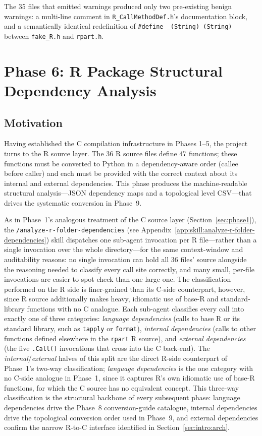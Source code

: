 \documentclass[12pt]{article}
\newcommand{\skillapp}[2]{\texttt{/#1} (see Appendix~\ref{app:skill:#2})}
\begin{document}
The 35 files that emitted warnings produced only two pre-existing benign warnings: a multi-line comment in \texttt{R\_CallMethodDef.h}'s documentation block, and a semantically identical redefinition of \texttt{\#define \_(String) (String)} between \texttt{fake\_R.h} and \texttt{rpart.h}.

\section{Phase 6: R Package Structural Dependency Analysis}
\label{sec:phase6}

\subsection{Motivation}

Having established the C compilation infrastructure in Phases 1--5, the project turns to the R source layer. The 36 R source files define 47 functions; these functions must be converted to Python in a dependency-aware order (callee before caller) and each must be provided with the correct context about its internal and external dependencies. This phase produces the machine-readable structural analysis---JSON dependency maps and a topological level CSV---that drives the systematic conversion in Phase~9.

As in Phase~1's analogous treatment of the C source layer (Section~\ref{sec:phase1}), the \skillapp{analyze-r-folder-dependencies}{analyze-r-folder-dependencies} skill dispatches one sub-agent invocation per R file---rather than a single invocation over the whole directory---for the same context-window and auditability reasons: no single invocation can hold all 36 files' source alongside the reasoning needed to classify every call site correctly, and many small, per-file invocations are easier to spot-check than one large one. The classification performed on the R side is finer-grained than its C-side counterpart, however, since R source additionally makes heavy, idiomatic use of base-R and standard-library functions with no C analogue. Each sub-agent classifies every call into exactly one of three categories: \emph{language dependencies} (calls to base R or its standard library, such as \texttt{tapply} or \texttt{format}), \emph{internal dependencies} (calls to other functions defined elsewhere in the \texttt{rpart} R source), and \emph{external dependencies} (the five \texttt{.Call()} invocations that cross into the C back-end). The \emph{internal}/\emph{external} halves of this split are the direct R-side counterpart of Phase~1's two-way classification; \emph{language dependencies} is the one category with no C-side analogue in Phase~1, since it captures R's own idiomatic use of base-R functions, for which the C source has no equivalent concept. This three-way classification is the structural backbone of every subsequent phase: language dependencies drive the Phase~8 conversion-guide catalogue, internal dependencies drive the topological conversion order used in Phase~9, and external dependencies confirm the narrow R-to-C interface identified in Section~\ref{sec:intro:arch}.
\end{document}
